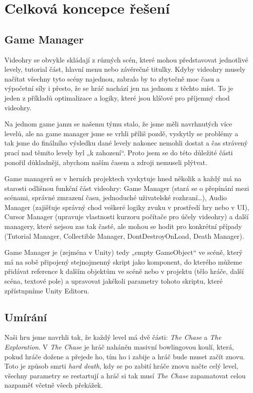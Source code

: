 \chapter{Celková koncepce řešení}

\section{Game Manager}
Videohry se obvykle skládají z různých scén, které mohou představovat jednotlivé levely, tutorial část, hlavní menu nebo závěrečné titulky. Kdyby videohry musely načítat všechny tyto scény najednou, zabralo by to zbytečně moc času a výpočetní síly i přesto, že se hráč nachází jen na jednom z těchto míst. To je jeden z příkladů optimalizace a logiky, které jsou klíčové pro příjemný chod videohry.

Na jednom game jamu se našemu týmu stalo, že jsme měli navrhnutých více levelů, ale na game manager jsme se vrhli příliš pozdě, vyskytly se problémy a tak jsme do finálního výsledku dané levely nakonec nemohli dostat a čas strávený prací nad těmito levely byl „k zahození“. Proto jsem se do této důležité části ponořil důkladněji, abychom naším časem a zdroji nemuseli plýtvat.

Game managerů se v herních projektech vyskytuje hned několik a každý má na starosti odlišnou funkční část videohry: Game Manager (stará se o přepínání mezi scénami, správné zmrazení času, jednoduché uživatelské rozhraní…), Audio Manager (zajišťuje správný chod veškeré logiky zvuku v prostředí hry nebo v UI), Cursor Manager (upravuje vlastnosti kurzoru počítače pro účely videohry) a další managery, které nejsou zas tak časté, ale mohou se hodit pro konkrétní případy (Tutorial Manager, Collectible Manager, DontDestroyOnLoad, Death Manager).

Game Manager je (zejména v Unity) tedy „empty GameObject“ ve scéně, který má na sobě připojený stejnojmenný skript jako komponent, do kterého můžeme přidávat reference k dalším objektům ve scéně nebo v projektu (tělo hráče, další scéna, textové pole) a upravovat jakékoli parametry tohoto skriptu, které zpřístupníme Unity Editoru.

\section{Umírání}
Naši hru jsme navrhli tak, že každý level má dvě části: \emph{The Chase} a \emph{The Exploration}. V \emph{The Chase} je hráč naháněn masivní bowlingovou koulí, která, pokud hráče dožene a přejede ho, tím ho i zabije a hráč bude muset začít znovu. Toto je způsob smrti \emph{hard death}, kdy se po zabití hráče znovu načte celý level, všechny parametry se restartují a hráč si tak musí \emph{The Chase} zapamatovat celou nazpaměť včetně všech překážek.

